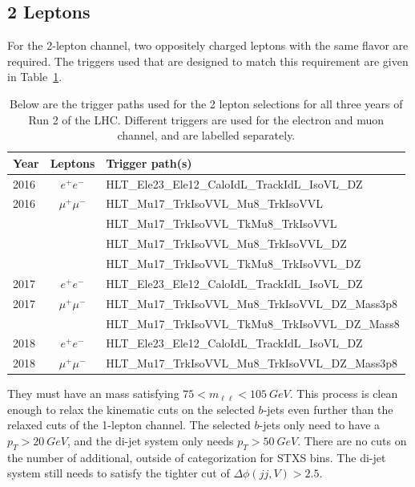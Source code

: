 \subsection{2 Leptons} \label{sec:resolved-2}

For the 2-lepton channel, two oppositely charged leptons with the same flavor are required.
The triggers used that are designed to match this requirement are given
in Table~\ref{tab:2-triggers}.
\begin{table}
  \centering
  \caption[Triggers for the 2 lepton selections]{
    Below are the trigger paths used for the 2 lepton selections
    for all three years of Run 2 of the LHC.
    Different triggers are used for the electron and muon channel,
    and are labelled separately.
  }
  \begin{tabular}{|l|c|l|}
    \hline
    Year & Leptons & Trigger path(s) \\
    \hline
    2016 & $e^+e^-$ & HLT\_Ele23\_Ele12\_CaloIdL\_TrackIdL\_IsoVL\_DZ \\
    \hline
    2016 & $\mu^+\mu^-$ & HLT\_Mu17\_TrkIsoVVL\_Mu8\_TrkIsoVVL \\
    & & HLT\_Mu17\_TrkIsoVVL\_TkMu8\_TrkIsoVVL \\
    & & HLT\_Mu17\_TrkIsoVVL\_Mu8\_TrkIsoVVL\_DZ \\
    & & HLT\_Mu17\_TrkIsoVVL\_TkMu8\_TrkIsoVVL\_DZ \\
    \hline
    2017 & $e^+e^-$ & HLT\_Ele23\_Ele12\_CaloIdL\_TrackIdL\_IsoVL\_DZ \\
    \hline
    2017 & $\mu^+\mu^-$ & HLT\_Mu17\_TrkIsoVVL\_Mu8\_TrkIsoVVL\_DZ\_Mass3p8 \\
    & & HLT\_Mu17\_TrkIsoVVL\_TkMu8\_TrkIsoVVL\_DZ\_Mass8 \\
    \hline
    2018 & $e^+e^-$ & HLT\_Ele23\_Ele12\_CaloIdL\_TrackIdL\_IsoVL\_DZ \\
    \hline
    2018 & $\mu^+\mu^-$ & HLT\_Mu17\_TrkIsoVVL\_Mu8\_TrkIsoVVL\_DZ\_Mass3p8 \\
    \hline
  \end{tabular}
  \label{tab:2-triggers}
\end{table}
They must have an mass satisfying $75 < m_{\ell\ell} < \SI{105}{GeV}$.
This process is clean enough to relax the kinematic cuts on the selected $b$-jets
even further than the relaxed cuts of the 1-lepton channel.
The selected $b$-jets only need to have a $p_T > \SI{20}{GeV}$,
and the di-jet system only needs $p_T > \SI{50}{GeV}$.
There are no cuts on the number of additional, outside of categorization for STXS bins.
The di-jet system still needs to satisfy the tighter cut of $\Delta\phi(jj,V) > 2.5$.

